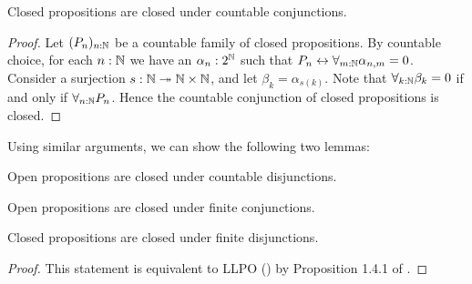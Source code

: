 \begin{lemma}\label{ClosedCountableConjunction}
  Closed propositions are closed under countable conjunctions.
\end{lemma}
\begin{proof}
  Let $(P_n)_{n:\mathbb{N}}$ be a countable family of closed propositions. 
  By countable choice, for each 
  $n:\mathbb{N}$ we have an $\alpha_n:2^{\mathbb{N}} $ 
  such that $P_n \leftrightarrow \forall_{m:\mathbb{N}} \alpha_{n,m} =0$. 
  Consider a surjection $s:\mathbb{N} \twoheadrightarrow \mathbb{N} \times \mathbb{N}$, and let 
  $\beta_k = \alpha_{s(k)}.$
  Note that $\forall_{k:\mathbb{N}} \beta_k = 0$ if and only if 
  $\forall_{n:\mathbb{N}} P_n$. 
  Hence the countable conjunction of closed propositions is closed. 
\end{proof} 
Using similar arguments, we can show the following two lemmas:
\begin{lemma}\label{OpenCountableDisjunction}
  Open propositions are closed under countable disjunctions. 
\end{lemma}
\begin{lemma}\label{OpenFiniteConjunction}
Open propositions are closed under finite conjunctions. 
\end{lemma}
\begin{lemma}\label{ClosedFiniteDisjunction} 
  Closed propositions are closed under finite disjunctions. 
\end{lemma}
\begin{proof}
  This statement is equivalent to LLPO () by  
  Proposition 1.4.1 of \cite{HannesDiener}. 
\end{proof}

